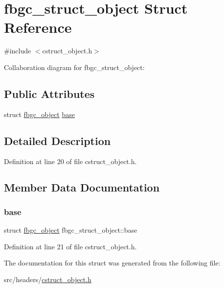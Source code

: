 \hypertarget{structfbgc__struct__object}{}\section{fbgc\+\_\+struct\+\_\+object Struct Reference}
\label{structfbgc__struct__object}


{\ttfamily \#include $<$cstruct\+\_\+object.\+h$>$}



Collaboration diagram for fbgc\+\_\+struct\+\_\+object\+:
\subsection*{Public Attributes}
\begin{DoxyCompactItemize}
\item 
struct \hyperlink{structfbgc__object}{fbgc\+\_\+object} \hyperlink{structfbgc__struct__object_afc8460b2bb24ac0f891c60fc3b1eb056}{base}
\end{DoxyCompactItemize}


\subsection{Detailed Description}


Definition at line 20 of file cstruct\+\_\+object.\+h.



\subsection{Member Data Documentation}
\mbox{\label{structfbgc__struct__object_afc8460b2bb24ac0f891c60fc3b1eb056}} 
\subsubsection{\texorpdfstring{base}{base}}
{\footnotesize\ttfamily struct \hyperlink{structfbgc__object}{fbgc\+\_\+object} fbgc\+\_\+struct\+\_\+object\+::base}



Definition at line 21 of file cstruct\+\_\+object.\+h.



The documentation for this struct was generated from the following file\+:\begin{DoxyCompactItemize}
\item 
src/headers/\hyperlink{cstruct__object_8h}{cstruct\+\_\+object.\+h}\end{DoxyCompactItemize}
